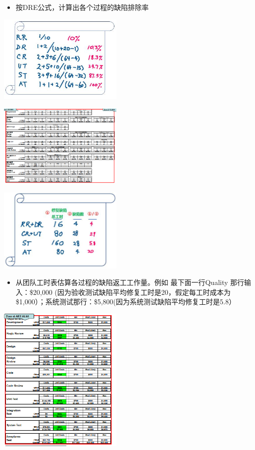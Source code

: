 \begin{itemize}
\tightlist
\item
  按DRE公式，计算出各个过程的缺陷排除率
\end{itemize}


\includegraphics[width=6cm]{2DreEstimateScreenshot_2021-12-01_2120491.jpg}

\includegraphics[width=6cm]{微信截图_20231031153027.png}




\includegraphics[width=6cm]{4reworkByPhaseScreenshot_2021-12-01_2148381.jpg}

\begin{itemize}
\tightlist
\item
  从团队工时表估算各过程的缺陷返工工作量。例如 最下面一行Quality
  那行输入：\$20,000 (因为验收测试缺陷平均修复工时是20，假定每工时成本为
  \$1,000）；系统测试那行：\$5,800(因为系统测试缺陷平均修复工时是5.8）
\end{itemize}

\includegraphics[width=6cm]{微信截图_20231031153355.png}

